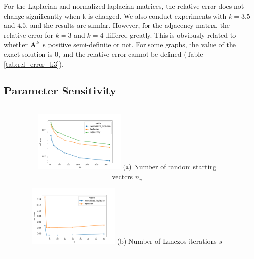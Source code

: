 \documentclass[senior,final,11pt]{iscs-thesis}
\begin{document}
For the Laplacian and normalized laplacian matrices, the relative error does not change significantly when k is changed. We also conduct experiments with $k = 3.5$ and $4.5$, and the results are similar. However, for the adjacency matrix, the relative error for $k=3$ and $k=4$ differed greatly. This is obviously related to whether ${\mathbf A}^k$ is positive semi-definite or not. For some graphs, the value of the exact solution is 0, and the relative error cannot be defined (Table \ref{tab:rel_error_k3}).

\subsection{Parameter Sensitivity}

\begin{figure}[htbp]
    \begin{center}
      \begin{tabular}{c}
        \begin{minipage}{0.33\hsize}
            \begin{center}
              \includegraphics[clip, width=4.5cm]{./figure/plot_param_nv.png}
              \hspace{1.6cm} (a) Number of random starting vectors $n_v$
            \end{center}
        \end{minipage}
        \begin{minipage}{0.33\hsize}
          \begin{center}
            \includegraphics[clip, width=4.5cm]{./figure/plot_param_s.png}
            \hspace{1.6cm} (b) Number of Lanczos iterations $s$
          \end{center}
        \end{minipage}
        \begin{minipage}{0.33\hsize}

\end{minipage}
\end{tabular}
\end{center}
\end{figure}
\end{document}
